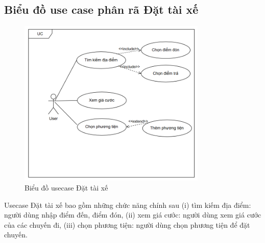 \documentclass[../DoAn.tex]{subfiles}
\begin{document}
\subsection{Biểu đồ use case phân rã Đặt tài xế}
\label{subsection:2.2.4}
\begin{figure}[H]
  \centering
  \includegraphics[width=0.8\textwidth]{Hinhve/Usecase_dat_tai_xe.png}
  \caption{Biểu đồ usecase Đặt tài xế}
  \label{fig:use_case_dat_tai_xe}
\end{figure}
Usecase Đặt tài xế bao gồm những chức năng chính sau (i) tìm kiếm địa điểm: người dùng nhập điểm đến, điểm đón, (ii) xem giá cước: người dùng xem giá cước của các chuyến đi, (iii) chọn phương tiện: người dùng chọn phương tiện để đặt chuyến.
\end{document}
